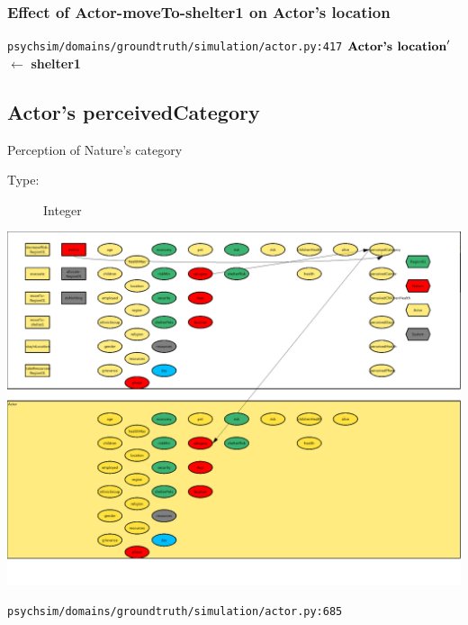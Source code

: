 \documentclass{article}%
\begin{document}
%
\subsubsection{Effect of Actor{-}moveTo{-}shelter1 on Actor's location}%
\label{ssubsec:Effect of Actor{-}moveTo{-}shelter1 on Actor's location}%
\begin{flushleft}%
\verb|psychsim/domains/groundtruth/simulation/actor.py:417|%
\linebreak%
$\mbox{\textbf{Actor's location}} '$%
$\leftarrow$%
\textbf{shelter1}%
\end{flushleft}

%
\subsection{Actor's perceivedCategory}%
\label{subsec:Actor's perceivedCategory}%
Perception of Nature's category%
\begin{description}%
\item[Type:]%
Integer%
\end{description}%
\includegraphics[width=\textwidth]{images/perceivedCategoryOfActor.png}%
\begin{flushleft}%
\verb|psychsim/domains/groundtruth/simulation/actor.py:685|%
\end{flushleft}%
\end{document}
